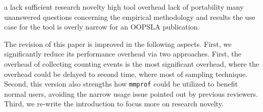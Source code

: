 \documentclass[pageno]{jpaper}
\newcommand{\MP}{\texttt{mmprof}}
\begin{document}
     a lack sufficient research novelty
    high tool overhead
    lack of portability
    many unanswered questions concerning the empirical methodology and results
    the use case for the tool is overly narrow for an OOPSLA publication.

The revision of this paper is improved in the following aspects. First, we significantly reduce its performance overhead via two approaches. First, the overhead of collecting counting events is the most significant overhead, where the overhead could be delayed to second time, where most of  sampling technique. Second, this version also strengths how \MP{} could be utilized to benefit normal users, avoiding the narrow usage issue pointed out by previous reviewers. Third, we re-write the introduction to focus more on research novelty. 
 
\pagebreak
{


}
\end{document}
